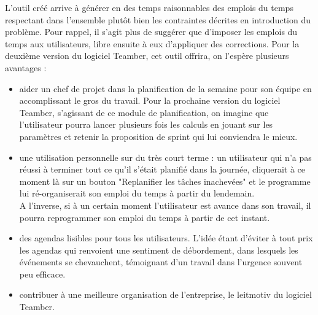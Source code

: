 \documentclass[12pt]{article}
\begin{document}
L'outil créé arrive à générer en des temps raisonnables des emplois du temps respectant dans l'ensemble plutôt bien les contraintes décrites en introduction du problème. Pour rappel, il s'agit plus de suggérer que d'imposer les emplois du temps aux utilisateurs, libre ensuite à eux d'appliquer des corrections. Pour la deuxième version du logiciel Teamber, cet outil offrira, on l'espère plusieurs avantages :
\begin{itemize}
\item aider un chef de projet dans la planification de la semaine pour son équipe en accomplissant le gros du travail. Pour la prochaine version du logiciel Teamber, s'agissant de ce module de planification, on imagine que l'utilisateur pourra lancer plusieurs fois les calculs en jouant sur les paramètres et retenir la proposition de sprint qui lui conviendra le mieux.

\item une utilisation personnelle sur du très court terme : un utilisateur qui n'a pas réussi à terminer tout ce qu'il s'était planifié dans la journée, cliquerait à ce moment là sur un bouton "Replanifier les tâches inachevées" et le programme lui ré-organiserait son emploi du temps à partir du lendemain.\\
A l'inverse, si à un certain moment l'utilisateur est avance dans son travail, il pourra reprogrammer son emploi du temps à partir de cet instant.

\item des agendas lisibles pour tous les utilisateurs. L'idée étant d'éviter à tout prix les agendas qui renvoient une sentiment de débordement, dans lesquels les événements se chevauchent, témoignant d'un travail dans l'urgence souvent peu efficace.

\item contribuer à une meilleure organisation de l'entreprise, le leitmotiv du logiciel Teamber.
\end{itemize}












\newpage
\end{document}
